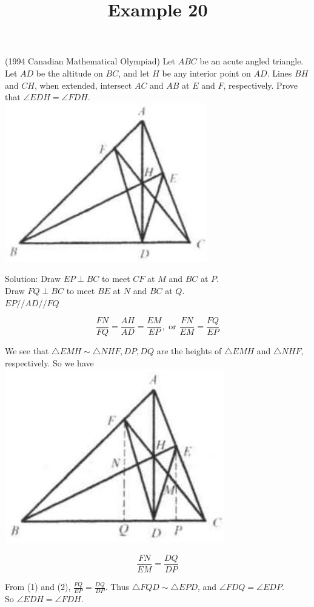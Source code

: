 \documentclass{article}
\title{Example 20}
\date{}
\begin{document}
\maketitle

(1994 Canadian Mathematical Olympiad) Let \(A B C\) be an acute angled triangle. Let \(A D\) be the altitude on \(B C\), and let \(H\) be any interior point on \(A D\). Lines \(B H\) and \(C H\), when extended, intersect \(A C\) and \(A B\) at \(E\) and \(F\), respectively. Prove that \(\angle E D H=\angle F D H\).\\
\centering
\includegraphics[width=\textwidth]{images/problem_image_1.jpg}

Solution:
Draw \(E P \perp B C\) to meet \(C F\) at \(M\) and \(B C\) at \(P\).\\
Draw \(F Q \perp B C\) to meet \(B E\) at \(N\) and \(B C\) at \(Q\).\\
\(E P / / A D / / F Q\)

\[
\frac{F N}{F Q}=\frac{A H}{A D}=\frac{E M}{E P}, \text { or } \frac{F N}{E M}=\frac{F Q}{E P}
\]

We see that \(\triangle E M H \sim \triangle N H F, D P, D Q\) are the heights of \(\triangle E M H\) and \(\triangle N H F\), respectively. So we have\\
\centering
\includegraphics[width=\textwidth]{images/reasoning_image_1.jpg}

\[
\frac{F N}{E M}=\frac{D Q}{D P}
\]

From (1) and (2), \(\frac{F Q}{E P}=\frac{D Q}{D P}\). Thus \(\triangle F Q D \sim \triangle E P D\), and \(\angle F D Q=\angle E D P\).\\
So \(\angle E D H=\angle F D H\).
\end{document}
